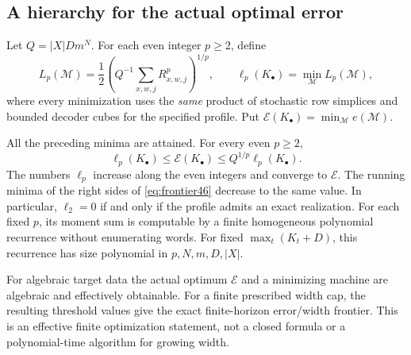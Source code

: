 \subsection{A hierarchy for the actual optimal error}
Let $Q=|X|Dm^N$. For each even integer $p\ge2$, define
\begin{equation}\label{eq:momnorm46}
 L_p(\mathcal M)=\frac12
       \left(Q^{-1}\sum_{x,w,j}R_{x,w,j}^{p}\right)^{1/p},\qquad
 \ell_p(K_\bullet)=\min_{\mathcal M}L_p(\mathcal M),
\end{equation}
where every minimization uses the \emph{same} product of stochastic row
simplices and bounded decoder cubes for the specified profile. Put
$\mathcal E(K_\bullet)=\min_{\mathcal M}e(\mathcal M)$.

\begin{theorem}\label{thm:moments46}
All the preceding minima are attained. For every even $p\ge2$,
\begin{equation}\label{eq:frontier46}
 \ell_p(K_\bullet)\le\mathcal E(K_\bullet)
                 \le Q^{1/p}\ell_p(K_\bullet).
\end{equation}
The numbers $\ell_p$ increase along the even integers and converge to
$\mathcal E$. The running minima of the right sides of
\eqref{eq:frontier46} decrease to the same value. In particular,
$\ell_2=0$ if and only if the profile admits an exact realization.
For each fixed $p$, its moment sum is computable by a finite homogeneous
polynomial recurrence without enumerating words. For fixed
$\max_t(K_t+D)$, this recurrence has size polynomial in $p,N,m,D,|X|$.

For algebraic target data the actual optimum $\mathcal E$ and a
minimizing machine are algebraic and effectively obtainable. For a
finite prescribed width cap, the resulting threshold values give the
exact finite-horizon error/width frontier. This is an effective finite
optimization statement, not a closed formula or a polynomial-time
algorithm for growing width.
\end{theorem}
